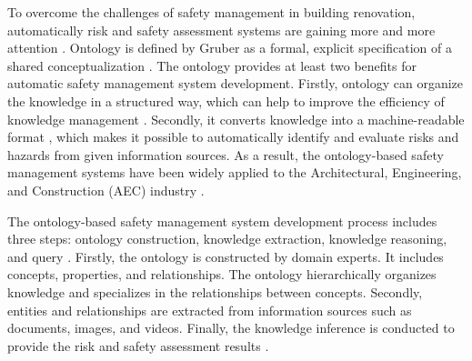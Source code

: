 To overcome the challenges of safety management in building renovation, automatically risk and safety assessment systems are gaining more and more attention \cite[]{xing2019ontology,doukari2023bim,amorocho2021reno,qi2023bim,zhou2023bim}. 
Ontology is defined by Gruber as a formal, explicit specification of a shared conceptualization \cite[]{gruber1995toward}. 
The ontology provides at least two benefits for automatic safety management system development. Firstly, ontology can organize the knowledge in a structured way, which can help to improve the efficiency of knowledge management \cite[]{zhang2015ontology}. 
Secondly, it converts knowledge into a machine-readable format \cite[]{donini1996reasoning}, which makes it possible to automatically identify and evaluate risks and hazards from given information sources.
As a result, the ontology-based safety management systems have been widely applied to the Architectural, Engineering, and Construction (AEC) industry \cite[]{zhong2015ontological,zhang2015ontology,wang2011ontology,guo2017ontology,xing2019ontology,gao2022knowledge}.

The ontology-based safety management system development process includes three steps: ontology construction, knowledge extraction, knowledge reasoning, and query \cite[]{doukari2024ontology,fang2020knowledge,wang2011ontology}. 
Firstly, the ontology is constructed by domain experts. It includes concepts, properties, and relationships. The ontology hierarchically organizes knowledge and specializes in the relationships between concepts. 
Secondly, entities and relationships are extracted from information sources such as documents, images, and videos. 
Finally, the knowledge inference is conducted to provide the risk and safety assessment results \cite[]{doukari2024ontology,fang2020knowledge}.

